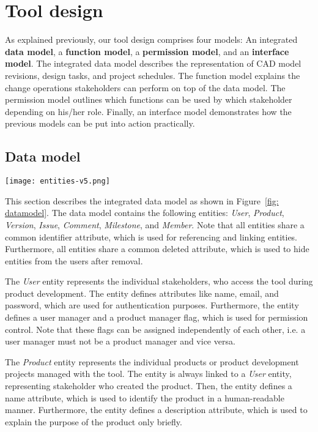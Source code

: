 \section{Tool design}
    \label{sec:contribution}

    As explained previously, our tool design comprises four models: An integrated \textbf{data model}, a \textbf{function model}, a \textbf{permission model}, and an \textbf{interface model}.
    The integrated data model describes the representation of CAD model revisions, design tasks, and project schedules.
    The function model explains the change operations stakeholders can perform on top of the data model.
    The permission model outlines which functions can be used by which stakeholder depending on his/her role.
    Finally, an interface model demonstrates how the previous models can be put into action practically.

    \subsection*{Data model}

    \begin{figure*}[ht]
        \centering
        \texttt{[image: entities-v5.png]}
        \caption{Data model}
        \label{fig: datamodel}
    \end{figure*}

    This section describes the integrated data model as shown in Figure~\ref{fig: datamodel}.
    The data model contains the following entities: \textit{User}, \textit{Product}, \textit{Version}, \textit{Issue}, \textit{Comment}, \textit{Milestone}, and \textit{Member}.
    Note that all entities share a common identifier attribute, which is used for referencing and linking entities.
    Furthermore, all entities share a common deleted attribute, which is used to hide entities from the users after removal.

    The \textit{User} entity represents the individual stakeholders, who access the tool during product development.
    The entity defines attributes like name, email, and password, which are used for authentication purposes.
    Furthermore, the entity defines a user manager and a product manager flag, which is used for permission control.
    Note that these flags can be assigned independently of each other, i.e. a user manager must not be a product manager and vice versa.
    
    The \textit{Product} entity represents the individual products or product development projects managed with the tool.
    The entity is always linked to a \textit{User} entity, representing stakeholder who created the product.
    Then, the entity defines a name attribute, which is used to identify the product in a human-readable manner.
    Furthermore, the entity defines a description attribute, which is used to explain the purpose of the product only briefly.

